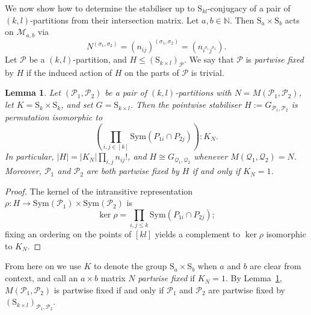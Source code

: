 \documentclass{daj}
\renewcommand\S{\mathrm{S}}
\renewcommand\P{\mathcal{P}}
\newcommand\Q{\mathcal{Q}}
\theoremstyle{plain}
\newtheorem{lemma}[theorem]{Lemma}
\theoremstyle{definition}
\begin{document}
We now show how to determine the stabiliser up to $\S_{kl}$-conjugacy of a pair of $(k,l)$-partitions from their intersection matrix. Let $a,b\in\mathbb{N}$. Then $\S_a\times \S_b$ acts on $\mathcal{M}_{a,b}$ via $$N^{(\sigma_1,\sigma_2)}=(n_{ij})^{(\sigma_1,\sigma_2)}=(n_{i^{\sigma_1} j^{\sigma_2}}).$$
Let $\mathcal{P}$ be a $(k,l)$-partition, and $H\leq (\S_{k\times l})_\mathcal{P}$. We say that $\mathcal{P}$ is \emph{partwise fixed} by $H$ if the induced action of $H$ on the parts of $\mathcal{P}$ is trivial.

\begin{lemma}\label{top}
Let $(\mathcal{P}_1,\mathcal{P}_2)$ be a pair of $(k,l)$-partitions with $N=M(\P_1,\P_2)$, let $K=\S_{k}\times \S_{k}$, and set $G=\S_{k\times l}$. 
Then the pointwise stabiliser $H:=G_{\mathcal{P}_1,\mathcal{P}_2}$ is permutation isomorphic to $$\left(\prod_{i,j\in [k]}\mathrm{Sym}(P_{1i}\cap P_{2j})\right) :  K_{N}.$$ In particular, $|H|=|K_{N}|\prod_{i,j}n_{ij}!$, and $H\cong G_{\Q_1,\Q_2}$ whenever $M(\Q_1,\Q_2)=N$. Moreover, $\P_1$ and $\P_2$ are both partwise fixed by $H$ if and only if $K_N=1$.
\end{lemma}
\begin{proof}
The kernel of the intransitive representation $\rho:H\to \mathrm{Sym}(\P_1)\times \mathrm{Sym}(\P_2)$ is  $$\ker\rho=\prod_{i,j\leq k}\mathrm{Sym}(P_{1i}\cap P_{2j});$$ fixing an ordering on the points of $[kl]$ yields a complement to $\ker \rho$ isomorphic to $K_N$.
\end{proof}

From here on we use $K$ to denote the group $\S_a\times \S_b$ when $a$ and $b$ are clear from context, and call an $a\times b$ matrix $N$ \emph{partwise fixed} if $K_N=1$. By Lemma~\ref{top}, $M(\P_1,\P_2)$ is partwise fixed if and only if $\P_1$ and $\P_2$ are partwise fixed by $(\S_{k\times l})_{\P_1,\P_2}$.
\end{document}
